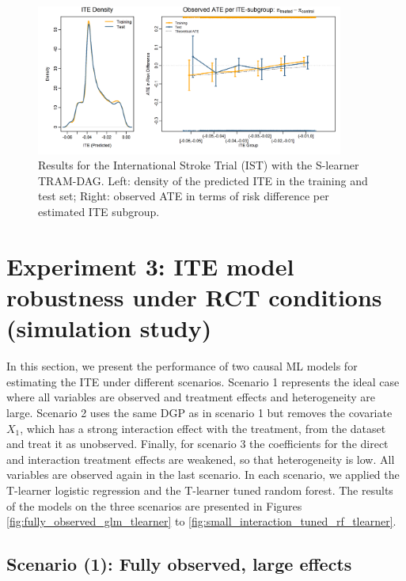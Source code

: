 \begin{figure}[htbp]
\centering
\includegraphics[width=0.9\textwidth]{img/results_IST/IST_TRAM_DAG_slearner_density_ITE_ATE.png}
\caption{Results for the International Stroke Trial (IST) with the S-learner TRAM-DAG. Left: density of the predicted ITE in the training and test set; Right: observed ATE in terms of risk difference per estimated ITE subgroup.}
\label{fig:IST_density_ITE_ATE_TRAM_DAG}
\end{figure}



\clearpage

 
\section{Experiment 3: ITE model robustness under RCT conditions (simulation study)} \label{sec:results_experiment3}

In this section, we present the performance of two causal ML models for estimating the ITE under different scenarios. Scenario 1 represents the ideal case where all variables are observed and treatment effects and heterogeneity are large. Scenario 2 uses the same DGP as in scenario 1 but removes the covariate $X_1$, which has a strong interaction effect with the treatment, from the dataset and treat it as unobserved. Finally, for scenario 3 the coefficients for the direct and interaction treatment effects are weakened, so that heterogeneity is low. All variables are observed again in the last scenario. In each scenario, we applied the T-learner logistic regression and the T-learner tuned random forest. The results of the models on the three scenarios are presented in Figures \ref{fig:fully_observed_glm_tlearner} to \ref{fig:small_interaction_tuned_rf_tlearner}.


\clearpage

\subsection{Scenario (1): Fully observed, large effects}




